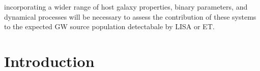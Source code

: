 \documentclass[12pt,twoside,openany]{book}
\begin{document}
incorporating a wider range of host galaxy properties, binary parameters, and dynamical processes will be necessary to assess the contribution of these systems to the expected GW source population detectabale by LISA or ET.



\clearpage





\tableofcontents






\pagestyle{fancy}


\chapter*{Introduction}
\end{document}

